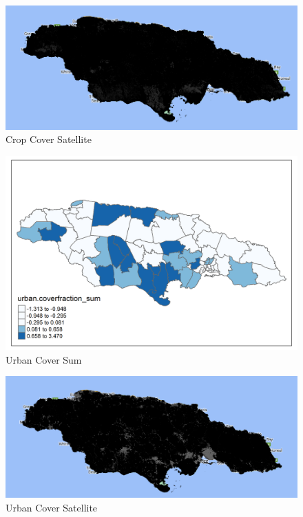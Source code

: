 \documentclass[
  12pt,
]{book}
\begin{document}
\begin{figure}
\centering
\includegraphics{Recursos/01_Session1/09_Suelo_cultivo.PNG}
\caption{Crop Cover Satellite}
\end{figure}

\begin{figure}
\centering
\includegraphics{Recursos/01_Session1/10_urban.coverfraction_sum.png}
\caption{Urban Cover Sum}
\end{figure}

\begin{figure}
\centering
\includegraphics{Recursos/01_Session1/11_Suelo_urbano.PNG}
\caption{Urban Cover Satellite}
\end{figure}
\end{document}
